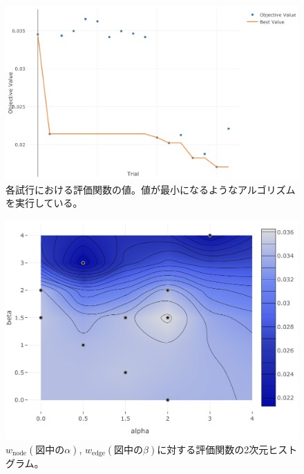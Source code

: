 \begin{figure}[H]
	\begin{center}
 \includegraphics[keepaspectratio, scale=0.3]
 	{Figure/Flavortagging/bayesian1.png}
 		\caption{各試行における評価関数の値。値が最小になるようなアルゴリズムを実行している。}
 		\label{dnnbayes1}
	\end{center}
\end{figure}
\begin{figure}[H]
	\begin{center}
 \includegraphics[keepaspectratio, scale=0.3]
 	{Figure/Flavortagging/bayesian2.png}
 		\caption{$w_{\mathrm{node}} (図中の\alpha)$, $w_{\mathrm{edge}} (図中の\beta)$に対する評価関数の2次元ヒストグラム。}
 		\label{dnnbayes2}
	\end{center}
\end{figure}
